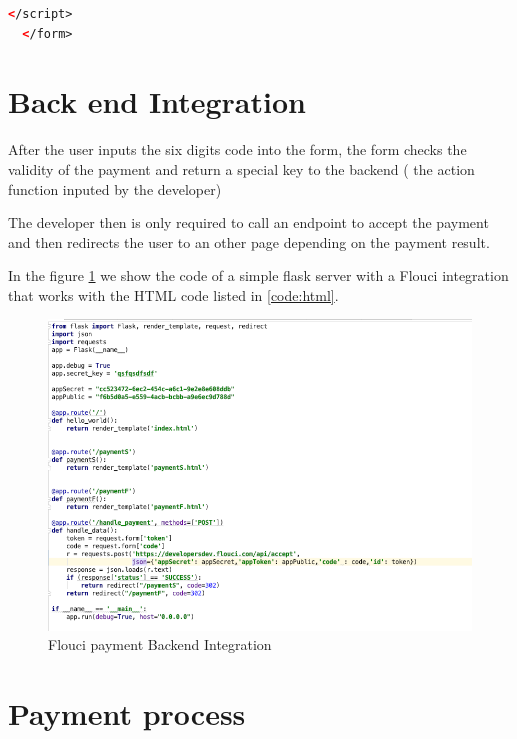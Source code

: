 \begin{spacing}{1.2}
\begin{lstlisting}[label=code:html,caption=Flouci Integration Java,language=xml]
    </script>
  </form>
\end{lstlisting}


\section{Back end Integration}
After the user inputs the six digits code into the form, the form checks the validity of the payment and return a special key to the backend ( the action function inputed by the developer)

The developer then is only required to call an endpoint to accept the payment and then redirects the user to an other page depending on the payment result.

In the figure \ref{fig:flask} we show the code of a simple flask server with a Flouci integration that works with the HTML code listed in \ref{code:html}.
\begin{figure}[H]\centering
\includegraphics[scale=0.5]{flask.png}
\caption{Flouci payment Backend Integration}
\label{fig:flask}
\end{figure}
\section{Payment process}


\end{spacing}
